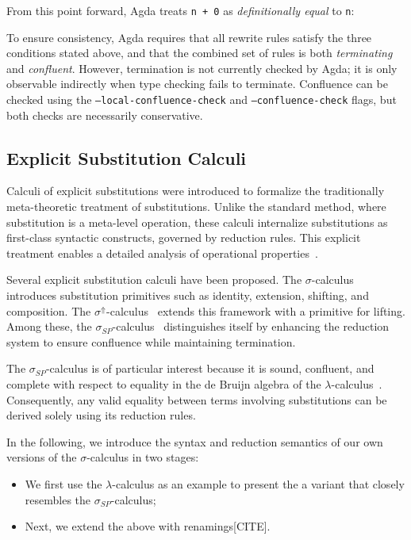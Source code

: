 \documentclass[screen,nonacm]{acmart}
\begin{document}
From this point forward, Agda treats \verb|n + 0| as \emph{definitionally
      equal} to \verb|n|: \ERewriteEx

To ensure consistency, Agda requires that all rewrite rules satisfy the three
conditions stated above, and that the combined set of rules is both
\emph{terminating} and \emph{confluent}. However, termination is not currently
checked by Agda; it is only observable indirectly when type checking fails to
terminate. Confluence can be checked using the
\texttt{--local-confluence-check} and \texttt{--confluence-check} flags, but
both checks are necessarily conservative.

\subsection{Explicit Substitution Calculi}\label{sec:pre-sig}

Calculi of explicit substitutions were introduced to formalize the
traditionally meta-theoretic treatment of substitutions. Unlike the standard
method, where substitution is a meta-level operation, these calculi internalize
substitutions as first-class syntactic constructs, governed by reduction rules.
This explicit treatment enables a detailed analysis of operational
properties~\cite{CITE1}.

Several explicit substitution calculi have been proposed. The
$\sigma$-calculus~\cite{CITE3} introduces substitution primitives such as
identity, extension, shifting, and composition. The
$\sigma^\Uparrow$-calculus~\cite{CITE4} extends this framework with a primitive
for lifting. Among these, the $\sigma_{SP}$-calculus~\cite{CITE5} distinguishes
itself by enhancing the reduction system to ensure confluence while maintaining
termination.

The $\sigma_{SP}$-calculus is of particular interest because it is sound,
confluent, and complete with respect to equality in the de Bruijn algebra of
the $\lambda$-calculus~\cite{CITE}. Consequently, any valid equality between
terms involving substitutions can be derived solely using its reduction rules.

In the following, we introduce the syntax and reduction semantics of our own
versions of the $\sigma$-calculus in two stages:

\begin{itemize}
      \item We first use the $\lambda$-calculus as an example to present the a variant that
            closely resembles the $\sigma_{SP}$-calculus;
      \item Next, we extend the above with renamings[CITE].
\end{itemize}
\end{document}
